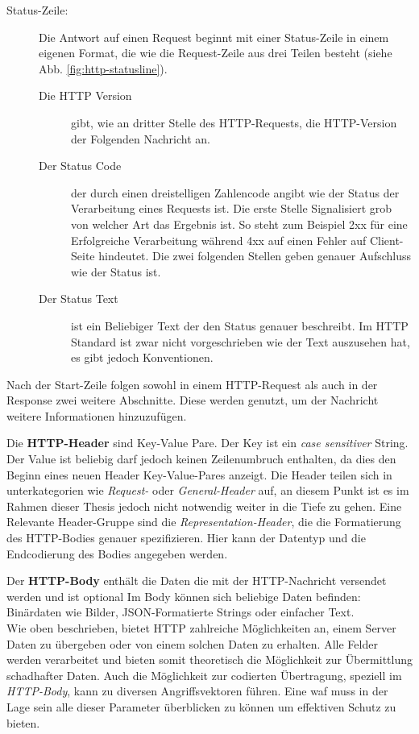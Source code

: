 \begin{description}
     \item[Status-Zeile:] Die Antwort auf einen Request beginnt mit einer Status-Zeile in einem eigenen Format, die wie die Request-Zeile aus drei Teilen besteht (siehe Abb. \ref{fig:http-statusline}).
     \begin{description}
          \item[Die HTTP Version] gibt, wie an dritter Stelle des HTTP-Requests, die HTTP-Version der Folgenden Nachricht an.
          \item[Der Status Code] der durch einen dreistelligen Zahlencode angibt wie der Status der Verarbeitung eines Requests ist. 
          Die erste Stelle Signalisiert grob von welcher Art das Ergebnis ist. 
          So steht zum Beispiel 2xx für eine Erfolgreiche Verarbeitung während 4xx auf einen Fehler auf Client-Seite hindeutet.
          Die zwei folgenden Stellen geben genauer Aufschluss wie der Status ist\cite{HTTPResponseStatus2023}.
          \item[Der Status Text] ist ein Beliebiger Text der den Status genauer beschreibt.
          Im HTTP Standard ist zwar nicht vorgeschrieben wie der Text auszusehen hat, es gibt jedoch Konventionen\cite{HTTPResponseStatus2023}.
     \end{description}
\end{description}

Nach der Start-Zeile folgen sowohl in einem HTTP-Request als auch in der Response zwei weitere Abschnitte. 
Diese werden genutzt, um der Nachricht weitere Informationen hinzuzufügen.

Die \textbf{HTTP-Header} sind Key-Value Pare. Der Key ist ein \textit{case sensitiver} String.
Der Value ist beliebig darf jedoch keinen Zeilenumbruch enthalten, da dies den Beginn eines neuen Header Key-Value-Pares anzeigt.
Die Header teilen sich in unterkategorien wie \textit{Request-} oder \textit{General-Header} auf, an diesem Punkt ist es im Rahmen dieser Thesis jedoch nicht notwendig weiter in die Tiefe zu gehen.
Eine Relevante Header-Gruppe sind die \textit{Representation-Header}, die die Formatierung des HTTP-Bodies genauer spezifizieren.
Hier kann der Datentyp und die Endcodierung des Bodies angegeben werden.

Der \textbf{HTTP-Body} enthält die Daten die mit der HTTP-Nachricht versendet werden und ist optional
Im Body können sich beliebige Daten befinden: Binärdaten wie Bilder, JSON-Formatierte Strings oder einfacher Text\cite{HTTPMessagesHTTP2024}.\\

Wie oben beschrieben, bietet HTTP zahlreiche Möglichkeiten an, einem Server Daten zu übergeben oder von einem solchen Daten zu erhalten.
Alle Felder werden verarbeitet und bieten somit theoretisch die Möglichkeit zur Übermittlung schadhafter Daten.
Auch die Möglichkeit zur codierten Übertragung, speziell im \textit{HTTP-Body}, kann zu diversen Angriffsvektoren führen.
Eine \ac{waf} muss in der Lage sein alle dieser Parameter überblicken zu können um effektiven Schutz zu bieten.

\pagebreak    